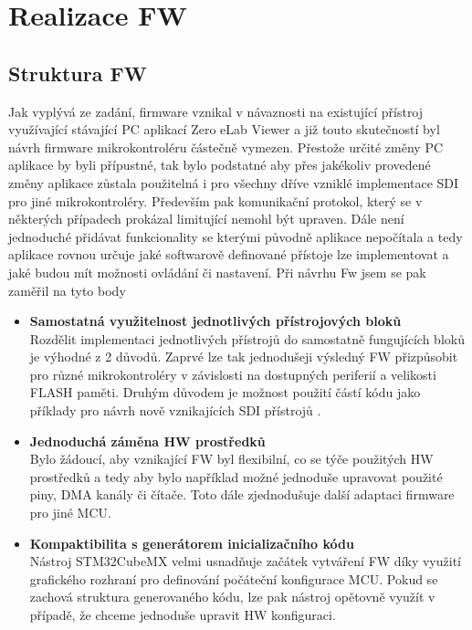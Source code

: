 
\chapter{Realizace FW}
\section{Struktura FW}
Jak vyplývá ze zadání, firmware vznikal v návaznosti na existující přístroj využívající stávající PC aplikací Zero eLab Viewer a již touto skutečností byl návrh firmware mikrokontroléru částečně vymezen. Přestože určité změny PC aplikace by byli přípustné, tak bylo podstatné aby přes jakékoliv provedené změny aplikace zůstala použitelná i pro všechny dříve vzniklé implementace SDI pro jiné mikrokontroléry. Především pak komunikační protokol, který se v některých případech prokázal limitující nemohl být upraven. Dále není jednoduché přidávat funkcionality se kterými původně aplikace nepočítala a tedy aplikace rovnou určuje jaké softwarově definované přístoje lze implementovat a jaké budou mít možnosti ovládání či nastavení. Při návrhu Fw jsem se pak zaměřil na tyto body

\begin{itemize}
	\item \textbf{Samostatná využitelnost jednotlivých přístrojových bloků}\\ 
	Rozdělit implementaci jednotlivých přístrojů do samostatně fungujících bloků je výhodné z 2 důvodů. Zaprvé lze tak jednodušeji výsledný FW přizpůsobit pro různé mikrokontroléry v závislosti na dostupných periferií a velikosti FLASH paměti. Druhým důvodem je možnost použití částí kódu jako příklady pro návrh nově vznikajících SDI přístrojů .
	\item  \textbf{Jednoduchá záměna HW prostředků}\\
	Bylo žádoucí, aby vznikající FW byl flexibilní, co se týče použitých HW prostředků a tedy aby bylo například možné jednoduše upravovat použité piny, DMA kanály či čítače. Toto dále zjednodušuje další adaptaci firmware pro jiné MCU.	
	\item \textbf{Kompaktibilita s generátorem inicializačního kódu}\\	
	Nástroj STM32CubeMX velmi usnadňuje začátek vytváření FW díky využití grafického rozhraní pro definování počáteční konfigurace MCU. Pokud se zachová struktura generovaného kódu, lze pak nástroj opětovně využít v případě, že chceme jednoduše upravit HW konfiguraci.
\end{itemize}


